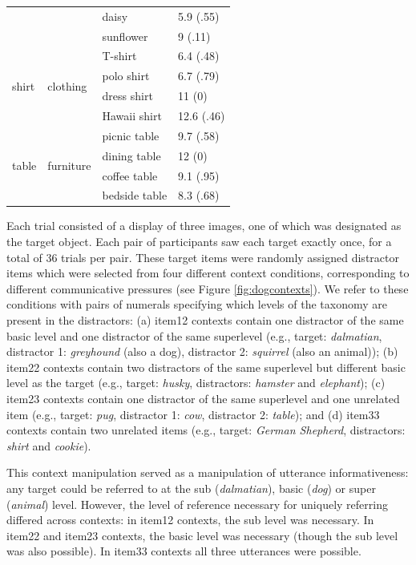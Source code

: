 \documentclass[11pt]{article}
\newcommand{\figref}[1]{Figure \ref{#1}}
\begin{document}
\begin{table}
\begin{tabular}{l l l l}
		& & daisy & 5.9 (.55)\\
		& & sunflower & 9 (.11)\\
	\midrule
	\multirow{4}{*}{shirt} & \multirow{4}{*}{clothing} & T-shirt & 6.4 (.48)\\
		& & polo shirt & 6.7 (.79)\\
		& & dress shirt & 11 (0)\\
		& & Hawaii shirt & 12.6 (.46)\\
	\midrule
	\multirow{4}{*}{table} & \multirow{4}{*}{furniture} & picnic table & 9.7 (.58)\\
		& & dining table & 12 (0)\\
		& & coffee table & 9.1 (.95)\\
		& & bedside table & 8.3 (.68)\\				
	\bottomrule
	\end{tabular}
\end{table}
Each trial consisted of a display of three images, one of which was designated as the target object. Each pair of participants saw each target exactly once, for a total of 36 trials per pair. These target items were randomly assigned distractor items which were selected from four different context conditions, corresponding to different communicative pressures (see \figref{fig:dogcontexts}). We refer to these conditions with pairs of numerals specifying which levels of the taxonomy are present in the distractors: (a) item12 contexts contain one distractor of the same basic level and one distractor of the same superlevel (e.g., target: \emph{dalmatian}, distractor 1: \emph{greyhound} (also a dog), distractor 2: \emph{squirrel} (also an animal)); (b) item22 contexts contain two distractors of the same superlevel but different basic level as the target (e.g., target: \emph{husky}, distractors: \emph{hamster} and \emph{elephant}); (c) item23 contexts contain one distractor of the same superlevel and one unrelated item (e.g., target: \emph{pug}, distractor 1: \emph{cow}, distractor 2: \emph{table}); and (d) item33 contexts contain two unrelated items (e.g., target: \emph{German Shepherd}, distractors: \emph{shirt} and \emph{cookie}). 

This context manipulation served as a manipulation of utterance informativeness: any target could be referred to at the sub (\emph{dalmatian}), basic (\emph{dog}) or super (\emph{animal}) level. However, the level of reference necessary for uniquely referring differed across contexts: in item12 contexts, the sub level was necessary. In item22 and item23 contexts, the basic level was necessary (though the sub level was also possible). In item33 contexts all three utterances were possible. %
\end{document}
